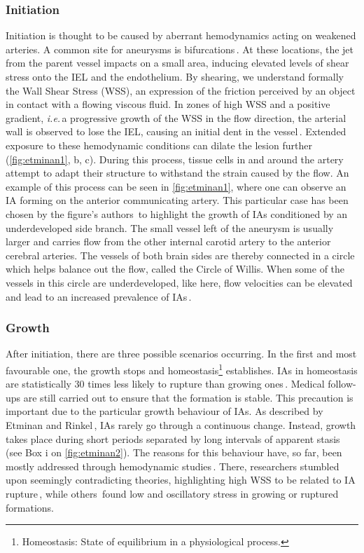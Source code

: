 \subsubsection*{Initiation}
Initiation is thought to be caused by aberrant hemodynamics acting on weakened arteries. A common site for aneurysms is bifurcations\,\cite{Brown2014}. At these locations, the jet from the parent vessel impacts on a small area, inducing elevated levels of shear stress onto the IEL and the endothelium. By shearing, we understand formally the Wall Shear Stress (WSS), an expression of the friction perceived by an object in contact with a flowing viscous fluid. In zones of high WSS and a positive gradient, \textit{i.e.}\,a progressive growth of the WSS in the flow direction, the arterial wall is observed to lose the IEL, causing an initial dent in the vessel\,\cite{Etminan2016, Meng2014}. Extended exposure to these hemodynamic conditions can dilate the lesion further (\autoref{fig:etminan1}, b, c). During this process, tissue cells in and around the artery attempt to adapt their structure to withstand the strain caused by the flow. An example of this process can be seen in \autoref{fig:etminan1}, where one can observe an IA forming on the anterior communicating artery. This particular case has been chosen by the figure's authors\,\cite{Etminan2016} to highlight the growth of IAs conditioned by an underdeveloped side branch. The small vessel left of the aneurysm is usually larger and carries flow from the other internal carotid artery to the anterior cerebral arteries. The vessels of both brain sides are thereby connected in a circle which helps balance out the flow, called the Circle of Willis. When some of the vessels in this circle are underdeveloped, like here, flow velocities can be elevated and lead to an increased prevalence of IAs\,\cite{Hindenes2023}.

\subsubsection*{Growth}
After initiation, there are three possible scenarios occurring. In the first and most favourable one, the growth stops and homeostasis\footnote{Homeostasis: State of equilibrium in a physiological process.} establishes. IAs in homeostasis are statistically 30 times less likely to rupture than growing ones\,\cite{Brinjikji2016, Tawk2021}. Medical follow-ups are still carried out to ensure that the formation is stable. This precaution is important due to the particular growth behaviour of IAs\@. As described by Etminan and Rinkel\,\cite{Etminan2016}, IAs rarely go through a continuous change. Instead, growth takes place during short periods separated by long intervals of apparent stasis (see Box i on \autoref{fig:etminan2}). The reasons for this behaviour have, so far, been mostly addressed through hemodynamic studies\,\cite{Meng2014, Etminan2016}. There, researchers stumbled upon seemingly contradicting theories, highlighting high WSS to be related to IA rupture\,\cite{Castro2009}, while others\,\cite{Xiang2011} found low and oscillatory stress in growing or ruptured formations.

